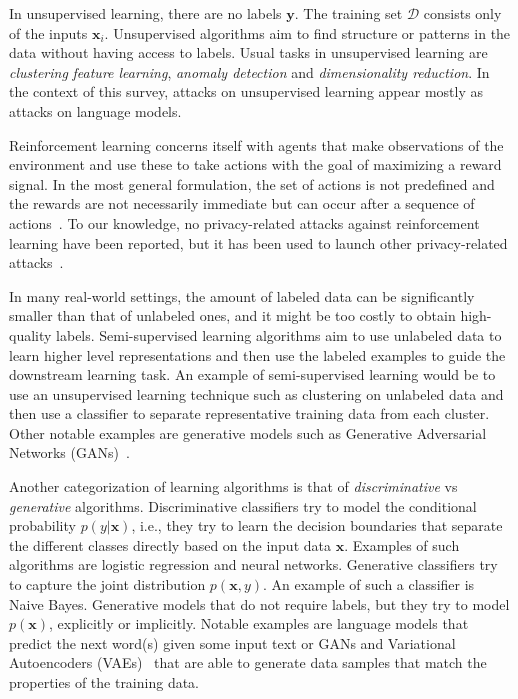 In unsupervised learning, there are no labels $\mathbf{y}$. The training set $\mathcal{D}$ consists only of the inputs $\mathbf{x}_{i}$. Unsupervised algorithms aim to find structure or patterns in the data without having access to labels. Usual tasks in unsupervised learning are \textit{clustering} \textit{feature learning}, \textit{anomaly detection} and \textit{dimensionality reduction}. In the context of this survey, attacks on unsupervised learning appear mostly as attacks on language models.

Reinforcement learning concerns itself with agents that make observations of the environment and use these to take actions with the goal of maximizing a reward signal. In the most general formulation, the set of actions is not predefined and the rewards are not necessarily immediate but can occur after a sequence of actions~. To our knowledge, no privacy-related attacks against reinforcement learning have been reported, but it has been used to launch other privacy-related attacks~.

In many real-world settings, the amount of labeled data can be significantly smaller than that of unlabeled ones, and it might be too costly to obtain high-quality labels. Semi-supervised learning algorithms aim to use unlabeled data to learn higher level representations and then use the labeled examples to guide the downstream learning task. An example of semi-supervised learning would be to use an unsupervised learning technique such as clustering on unlabeled data and then use a classifier to separate representative training data from each cluster. Other notable examples are generative models such as Generative Adversarial Networks (GANs)~.

Another categorization of learning algorithms is that of \textit{discriminative} vs \textit{generative} algorithms. Discriminative classifiers try to model the conditional probability $p(y | \mathbf{x})$, i.e., they try to learn the decision boundaries that separate the different classes directly based on the input data $\mathbf{x}$. Examples of such algorithms are logistic regression and neural networks. Generative classifiers try to capture the joint distribution $p(\mathbf{x}, y)$. An example of such a classifier is Naive Bayes. Generative models that do not require labels, but they try to model $p(\mathbf{x})$, explicitly or implicitly. Notable examples are language models that predict the next word(s) given some input text or GANs and Variational Autoencoders (VAEs)~ that are able to generate data samples that match the properties of the training data.

